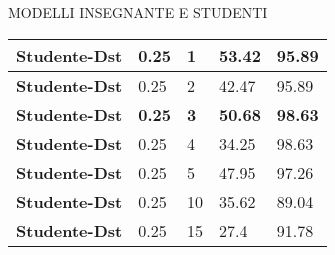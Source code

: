\begin{frame}{MODELLI INSEGNANTE E STUDENTI}
\begin{minipage}{\linewidth}
\begin{minipage}{0.50\linewidth}
\begin{center}
{\begin{tabular}{|M{1.7cm}||M{1.3cm}|M{1.4cm}||M{1.3cm}|M{1.3cm}|}
            {\bfseries{Studente-Dst}} & 0.25 & 1 & \color{red}53.42 & \color{red}95.89\\
            \hline
            {\bfseries{Studente-Dst}} & 0.25 & 2 & \color{red}42.47 & \color{red}95.89\\
            \hline
            \bfseries{Studente-Dst} & \bfseries{0.25} & \bfseries{3}& {\color{OliveGreen}\bfseries{50.68}} & {\color{OliveGreen}\bfseries{98.63}}\\
            \hline
            {\bfseries{Studente-Dst}} & 0.25 & 4 & \color{red}34.25 & \color{red}98.63\\
            \hline
            {\bfseries{Studente-Dst}} & 0.25 & 5 & \color{red}47.95 & \color{red}97.26\\
            \hline
            {\bfseries{Studente-Dst}} & 0.25 & 10 & \color{red}35.62 & \color{red}89.04\\
            \hline
            {\bfseries{Studente-Dst}} & 0.25 & 15 & \color{red}27.4 & \color{red}91.78\\
            \hline
         \end{tabular}}
    \end{center}
    \end{minipage}
  \end{minipage}
\end{frame}


  
